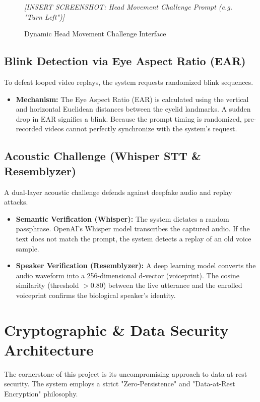 \documentclass[12pt,a4paper]{article}
\begin{document}
\begin{figure}[H]
    \centering
    \colorbox{placeholderbg}{\parbox{0.8\textwidth}{\centering \vspace{3cm} \textit{[INSERT SCREENSHOT: Head Movement Challenge Prompt (e.g. "Turn Left")]} \vspace{3cm}}}
    \caption{Dynamic Head Movement Challenge Interface}
    \label{fig:head_challenge}
\end{figure}

\subsection{Blink Detection via Eye Aspect Ratio (EAR)}
To defeat looped video replays, the system requests randomized blink sequences.
\begin{itemize}
    \item \textbf{Mechanism:} The Eye Aspect Ratio (EAR) is calculated using the vertical and horizontal Euclidean distances between the eyelid landmarks. A sudden drop in EAR signifies a blink. Because the prompt timing is randomized, pre-recorded videos cannot perfectly synchronize with the system's request.
\end{itemize}

\subsection{Acoustic Challenge (Whisper STT \& Resemblyzer)}
A dual-layer acoustic challenge defends against deepfake audio and replay attacks.
\begin{itemize}
    \item \textbf{Semantic Verification (Whisper):} The system dictates a random passphrase. OpenAI's Whisper model transcribes the captured audio. If the text does not match the prompt, the system detects a replay of an old voice sample.
    \item \textbf{Speaker Verification (Resemblyzer):} A deep learning model converts the audio waveform into a 256-dimensional d-vector (voiceprint). The cosine similarity (threshold $> 0.80$) between the live utterance and the enrolled voiceprint confirms the biological speaker's identity.
\end{itemize}

\section{Cryptographic \& Data Security Architecture}
The cornerstone of this project is its uncompromising approach to data-at-rest security. The system employs a strict "Zero-Persistence" and "Data-at-Rest Encryption" philosophy.
\end{document}
